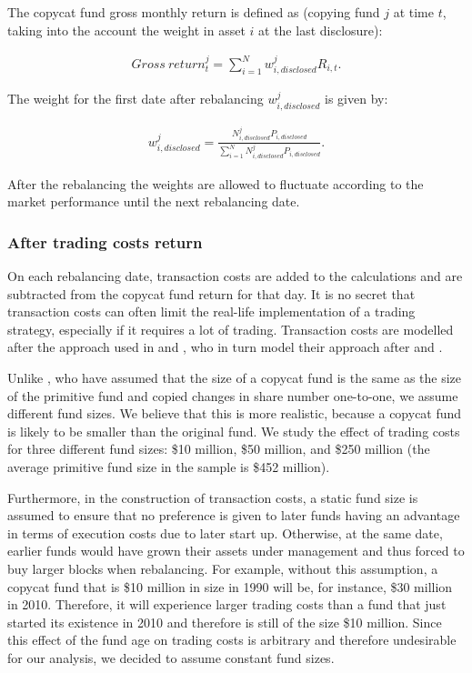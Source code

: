 \documentclass[12pt, a4]{article}
\begin{document}
The copycat fund gross monthly return is defined as (copying fund $j$ at time $t$, taking into the account the weight in asset $i$ at the last disclosure):

\begin{align}
    Gross\ return_t^j = \sum^N_{i = 1}w_{i,disclosed}^j R_{i,t}.
\end{align}

The weight for the first date after rebalancing $w_{i,disclosed}^j$ is given by:

\begin{align}
    w_{i, disclosed}^j = \frac{N_{i, disclosed}^j P_{i, disclosed}}{\sum_{i = 1}^N N_{i, disclosed}^j P_{i, disclosed}}.
\end{align}

After the rebalancing the weights are allowed to fluctuate according to the market performance until the next rebalancing date.

\subsubsection{After trading costs return}

On each rebalancing date, transaction costs are added to the calculations and are subtracted from the copycat fund return for that day. It is no secret that transaction costs can often limit the real-life implementation of a trading strategy, especially if it requires a lot of trading. Transaction costs are modelled after the approach used in \cite{kacperczyk} and \cite{verbeek}, who in turn model their approach after \cite{keim} and \cite{wermers_2000}.

Unlike \cite{verbeek}, who have assumed that the size of a copycat fund is the same as the size of the primitive fund and copied changes in share number one-to-one, we assume different fund sizes. We believe that this is more realistic, because a copycat fund is likely to be smaller than the original fund. We study the effect of trading costs for three different fund sizes: \$10 million, \$50 million, and \$250 million (the average primitive fund size in the sample is \$452 million). 

Furthermore, in the construction of transaction costs, a static fund size is assumed to ensure that no preference is given to later funds having an advantage in terms of execution costs due to later start up. Otherwise, at the same date, earlier funds would have grown their assets under management and thus forced to buy larger blocks when rebalancing. For example, without this assumption, a copycat fund that is \$10 million in size in 1990 will be, for instance, \$30 million in 2010. Therefore, it will experience larger trading costs than a fund that just started its existence in 2010 and therefore is still of the size \$10 million. Since this effect of the fund age on trading costs is arbitrary and therefore undesirable for our analysis, we decided to assume constant fund sizes.
\end{document}
